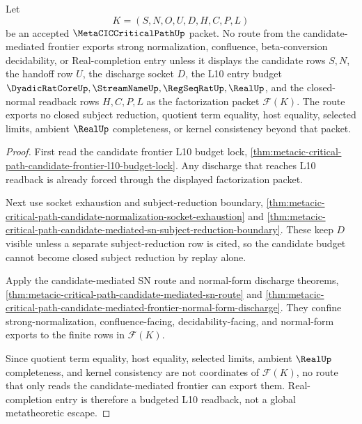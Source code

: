 \begin{theorem}
\label{thm:metacic-critical-path-normalization-budget-nonescape}
Let
$$
K=(S,N,O,U,D,H,C,P,L)
$$
be an accepted $\MetaCICCriticalPathUp$ packet. No route from the candidate-mediated frontier exports strong normalization, confluence, beta-conversion decidability, or Real-completion entry unless it displays the candidate rows $S,N$, the handoff row $U$, the discharge socket $D$, the L10 entry budget $\DyadicRatCoreUp,\StreamNameUp,\RegSeqRatUp,\RealUp$, and the closed-normal readback rows $H,C,P,L$ as the factorization packet $\mathcal{F}(K)$. The route exports no closed subject reduction, quotient term equality, host equality, selected limits, ambient $\RealUp$ completeness, or kernel consistency beyond that packet.
\end{theorem}
\begin{proof}
First read the candidate frontier L10 budget lock, \autoref{thm:metacic-critical-path-candidate-frontier-l10-budget-lock}. Any discharge that reaches L10 readback is already forced through the displayed factorization packet.

Next use socket exhaustion and subject-reduction boundary, \autoref{thm:metacic-critical-path-candidate-normalization-socket-exhaustion} and \autoref{thm:metacic-critical-path-candidate-mediated-sn-subject-reduction-boundary}. These keep $D$ visible unless a separate subject-reduction row is cited, so the candidate budget cannot become closed subject reduction by replay alone.

Apply the candidate-mediated SN route and normal-form discharge theorems, \autoref{thm:metacic-critical-path-candidate-mediated-sn-route} and \autoref{thm:metacic-critical-path-candidate-mediated-frontier-normal-form-discharge}. They confine strong-normalization, confluence-facing, decidability-facing, and normal-form exports to the finite rows in $\mathcal{F}(K)$.

Since quotient term equality, host equality, selected limits, ambient $\RealUp$ completeness, and kernel consistency are not coordinates of $\mathcal{F}(K)$, no route that only reads the candidate-mediated frontier can export them. Real-completion entry is therefore a budgeted L10 readback, not a global metatheoretic escape.
\end{proof}

